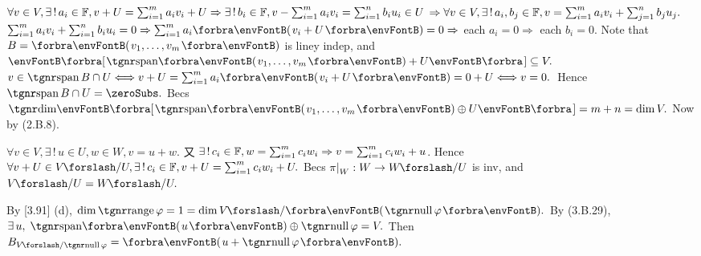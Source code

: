 $\forall v\in V,\exists\,!\,a_i\in{\mathbb{F}},v+U=\sum_{i=1}^m a_i v_i+U\Rightarrow\exists\,!\,b_i\in{\mathbb{F}},v-\sum_{i=1}^m a_i v_i=\sum_{i=1}^n b_i u_i\in U$\parSol{\vspace{2pt}}
$\Rightarrow \forall v\in V,\exists\,!\,a_i,b_j\in{\mathbb{F}},v=\sum_{i=1}^m a_i v_i+\sum_{j=1}^n b_j u_j.$\PfEnd\parSol{\vspace{6pt}}
\Or $\sum_{i=1}^m a_i v_i+\sum_{i=1}^n b_i u_i=0\Rightarrow\sum_{i=1}^m a_i\Par{v_i+U}=0\Rightarrow$ each $a_i=0\Rightarrow$ each $b_i=0.$\PfEnd\parSol{\vspace{6pt}}
\Or Note that $B=\Par{v_1,\dots,v_m}$ is liney indep, and $\Sbra{\Span{v_1,\dots,v_m}+U}\subseteq V.$\parSol{}
$v\in\Spn B\cap U\Longleftrightarrow v+U=\sum_{i=1}^ma_i\Par{v_i+U}=0+U\Longleftrightarrow v=0.$ \,Hence $\Spn B\cap U=\zeroSubs.$\parSol{}
Becs $\Dim\Sbra{\Span{v_1,\dots,v_m}\oplus U}=m+n=\dim V.$ \;Now by (2.B.8).\PfEnd
\SepLine

$\forall v\in V,\exists\,!\,u\in U,w\in W,v=u+w.$ 又 $\exists\,!\,c_i\in{\mathbb{F}},w=\sum_{i=1}^m c_i w_i\Rightarrow v=\sum_{i=1}^m c_i w_i+u$.\parSol{}
Hence $\forall v+U\in V\XSlash U,\exists\,!\,c_i\in\Fbb,v+U=\sum_{i=1}^m c_i w_i+U.$\PfEnd\vspace{2pt}\parSol{}
\Or Becs $\pi\mmid_W:W\rightarrow W\XSlash U$ is inv, and $V\XSlash U=W\XSlash U.$\PfEnd
\SepLine

\def\Pure{{\textup{\tgnr Pure}}\,}


By [3.91] (d), $\dim\range\varphi=1=\dim V\XSlash \Par{\null \varphi}.$\parSol{}
\Or By ({3.B.29}), $\exists\,u,\;\Span{u}\oplus\null\varphi=V.$ Then $B_{V\XSlash \null\varphi}=\Par{u+\null\varphi}.$\PfEnd\vspace{-2pt}
\SepLine

